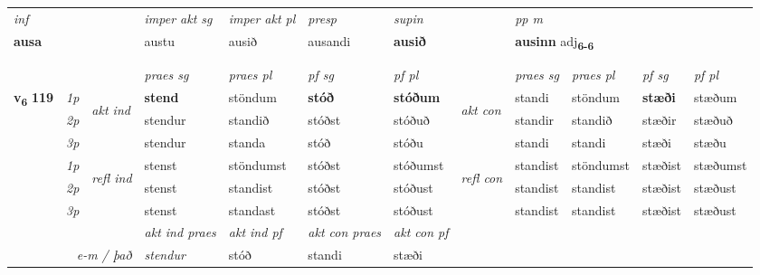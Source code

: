 \begin{longtable}[l]{X>{\footnotesize\itshape}llXXXXlXXXX}
   {\textit{inf}} & &  & \textit{imper akt sg} & \textit{imper akt pl}   & \textit{presp} & \textit{supin}  && \textit{pp m} \\*
  {\textbf{ausa}} & && austu  & ausið   & ausandi &  \textbf{ausið}  && \multicolumn{2}{l}{\textbf{ausinn} adj\textbf{\textsubscript{6-6}}} \\*

\midrule
 & \\*
  & \\
   \midrule
 & &   & \textit{praes sg}  & \textit{praes pl}    & \textit{ pf sg} & \textit{pf pl} & & \textit{praes sg}  & \textit{praes pl}    & \textit{pf sg} & \textit{pf pl }  \\ \cmidrule{4-7} \cmidrule{9-12}
 \multirow{2}{*}{{{\textbf{v{\textsubscript{6}}} \Large{\textbf{119}}}}}  & 1p & \multirow{3}{*}{\begin{turn}{90}\textit{akt ind}\end{turn}} & \textbf{stend} & stöndum & \textbf{stóð} & \textbf{stóðum} & \multirow{3}{*}{\begin{turn}{90}\textit{akt con}\end{turn}} &standi & stöndum & \textbf{stæði} & stæðum\\*
 & 2p &  &  stendur  & standið & stóðst & stóðuð & & standir & standið & stæðir & stæðuð \\*
 & 3p &  & stendur & standa & stóð & stóðu & & standi & standi& stæði & stæðu \\*
\cmidrule{4-7} \cmidrule{9-12}
 & 1p & \multirow{3}{*}{\begin{turn}{90}\textit{refl ind}\end{turn}}  & stenst & stöndumst & stóðst & stóðumst & \multirow{3}{*}{\begin{turn}{90}\textit{refl con}\end{turn}}  &standist & stöndumst & stæðist & stæðumst \\*
 & 2p &  & stenst & standist & stóðst & stóðust & &standist & standist & stæðist & stæðust \\*
 & 3p  & & stenst & standast & stóðst & stóðust & & standist & standist& stæðist & stæðust \\*
\cmidrule{4-7} \cmidrule{9-12}

   && &  \textit{akt ind praes} & \textit{akt ind pf} & \textit{akt con praes} & \textit{akt con pf} \\*
\multicolumn{3}{r}{\textit{e-m / það}} & stendur & stóð & standi & stæði \\*


\end{longtable}
